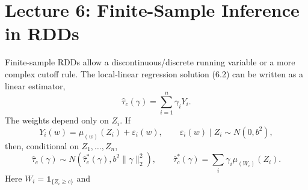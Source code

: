 \section{Lecture 6: Finite-Sample Inference in RDDs}
Finite-sample RDDs allow a discontinuous/discrete running variable or a more complex cutoff rule. The local-linear regression solution (6.2) can be written as a linear estimator,
\[
\widehat\tau_c(\gamma)=\sum_{i=1}^n\gamma_iY_i.\tag{6.3 in the notes}
\]
The weights depend only on $Z_i$.
 If
\[
Y_i(w)=\mu_{(w)}(Z_i)+\varepsilon_i(w),\qquad
\varepsilon_i(w)\mid Z_i\sim N(0,b^2),
\]
then, conditional on $Z_1,\ldots,Z_n$,
\[
\widehat\tau_c(\gamma)\sim N(\widehat\tau_c^*(\gamma),b^2\|\gamma\|_2^2),
\qquad \widehat\tau_c^*(\gamma)=\sum_i\gamma_i\mu_{(W_i)}(Z_i).
\]
Here $W_i=\mathbf1_{\{Z_i\geq c\}}$ and 
